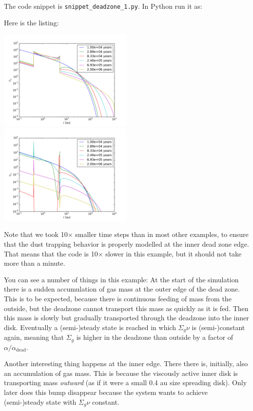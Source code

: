 \documentclass{book}
\newcommand{\code}[1]{{\small\tt #1}}
\begin{document}
The code snippet is
\code{snippet\_deadzone\_1.py}. In Python run it as:
\begin{codebox}
\end{codebox}
Here is the listing:

\centerline{\includegraphics[width=0.5\textwidth]{../snippets/fig_snippet_deadzone_1_1.pdf}
  \includegraphics[width=0.5\textwidth]{../snippets/fig_snippet_deadzone_1_2.pdf}}
Note that we took 10$\times$ smaller time steps than in most other examples, to
ensure that the dust trapping behavior is properly modelled at the inner dead
zone edge. That means that the code is 10$\times$ slower in this example, but it
should not take more than a minute.

You can see a number of things in this example: At the start of the simulation
there is a sudden accumulation of gas mass at the outer edge of the dead zone.
This is to be expected, because there is continuous feeding of mass from the
outside, but the deadzone cannot transport this mass as quickly as it is fed.
Then this mass is slowly but gradually transported through the deadzone into
the inner disk. Eventually a (semi-)steady state is reached in which
$\Sigma_g\nu$ is (semi-)constant again, meaning that $\Sigma_g$ is higher in
the deadzone than outside by a factor of $\alpha/\alpha_{\mathrm{dead}}$.

Another interesting thing happens at the inner edge. There there is, initially,
also an accumulation of gas mass. This is because the viscously
active inner disk is transporting mass {\em outward} (as if it were a small
0.4 au size spreading disk). Only later does this bump disappear because
the system wants to achieve (semi-)steady state with $\Sigma_g\nu$ constant.
\end{document}
